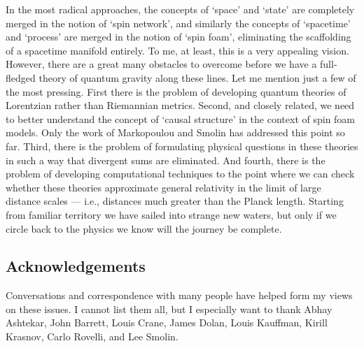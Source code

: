 \documentclass[12pt,amsfonts]{article}
\begin{document}
In the most radical approaches, the concepts of `space' and `state' are
completely merged in the notion of `spin network',  and similarly the
concepts of `spacetime' and `process' are merged in the notion of `spin
foam', eliminating the scaffolding of a spacetime manifold entirely.  To
me, at least, this is a very appealing vision.  However, there are a
great many obstacles to overcome before we have a full-fledged theory
of quantum gravity along these lines. Let me mention just a few of the
most pressing.   First there is the problem of developing quantum
theories of Lorentzian rather than Riemannian metrics.  Second, and
closely related, we need to better understand the concept of `causal
structure' in the context of spin foam models.  Only the work of
Markopoulou and Smolin \cite{MS} has addressed this point so far. 
Third, there is the problem of formulating physical questions in these
theories in such a way that divergent sums are eliminated.  And fourth,
there is the problem of developing computational techniques to the point
where we can check whether these theories approximate general relativity
in the limit of large distance scales --- i.e., distances much greater
than the Planck length.  Starting from familiar territory we have
sailed into strange new waters, but only if we circle back to the
physics we know will the journey be complete.  

\subsection*{Acknowledgements}

Conversations and correspondence with many people have helped form my
views on these issues.  I cannot list them all, but I especially want to
thank Abhay Ashtekar, John Barrett, Louis Crane, James Dolan, Louis
Kauffman, Kirill Krasnov, Carlo Rovelli, and Lee Smolin.
\end{document}
